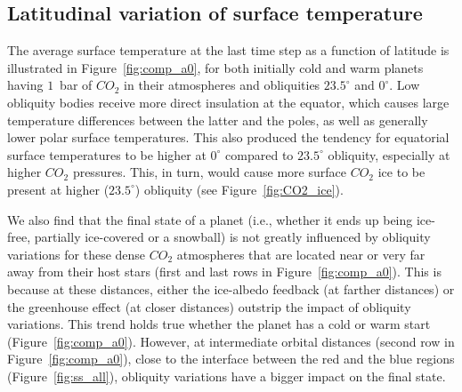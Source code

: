 \documentclass[fleqn,usenatbib]{mnras}
\begin{document}
\subsection{Latitudinal variation of surface temperature}
\label{sec:surf_temp}
The  average surface temperature at the last time step as a function of latitude is illustrated in Figure~\ref{fig:comp_a0}, for both initially cold and warm planets having $1$~bar of $CO_{\mathrm{2}}$ in their atmospheres and obliquities $23.5^{\circ}$ and $0^{\circ}$. Low obliquity bodies receive more direct insulation at the equator, which causes large temperature differences between the latter and the poles, as well as generally lower polar surface temperatures. This also produced the tendency for equatorial surface temperatures to be higher at $0^{\circ}$ compared to $23.5^{\circ}$ obliquity, especially at higher $CO_{\mathrm{2}}$ pressures. This, in turn, would cause more surface $CO_{\mathrm{2}}$ ice to be present at higher ($23.5^{\circ}$) obliquity (see Figure~\ref{fig:CO2_ice}).

We also find that the final state of a planet (i.e., whether it ends up being ice-free, partially ice-covered or a snowball) is not greatly influenced by obliquity variations for these dense $CO_{\mathrm{2}}$ atmospheres  that are located near or very far away from their host stars (first and last rows in Figure~\ref{fig:comp_a0}). This is because at these distances, either the ice-albedo feedback (at farther distances) or the greenhouse effect (at closer distances) outstrip the impact of obliquity variations. This trend holds true whether the planet has a cold or warm start (Figure~\ref{fig:comp_a0}). However, at intermediate orbital distances (second row in Figure~\ref{fig:comp_a0}), close to the interface between the red and the blue regions (Figure~\ref{fig:ss_all}), obliquity variations have a bigger impact on the final state.
%

\end{document}
